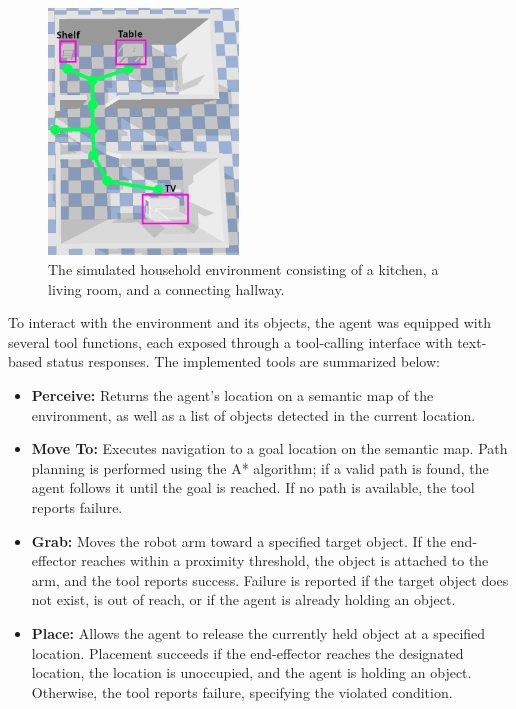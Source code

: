 \documentclass[../report.tex]{subfiles}
\begin{document}
\begin{figure}[h!]
	\centering
	\includegraphics[width=0.45\textwidth]{figures/environment.png}
	\caption{The simulated household environment consisting of a kitchen, a living room, and a connecting hallway.}
	\label{fig:environment}
\end{figure}

To interact with the environment and its objects, the agent was equipped with several tool functions, each exposed through a tool-calling interface with text-based status responses. The implemented tools are summarized below:
\begin{itemize}
	\item \textbf{Perceive:} Returns the agent's location on a semantic map of the environment, as well as a list of objects detected in the current location.
	\item \textbf{Move To:} Executes navigation to a goal location on the semantic map. Path planning is performed using the A* algorithm; if a valid path is found, the agent follows it until the goal is reached. If no path is available, the tool reports failure.
	\item \textbf{Grab:} Moves the robot arm toward a specified target object. If the end-effector reaches within a proximity threshold, the object is attached to the arm, and the tool reports success. Failure is reported if the target object does not exist, is out of reach, or if the agent is already holding an object.
	\item \textbf{Place:} Allows the agent to release the currently held object at a specified location. Placement succeeds if the end-effector reaches the designated location, the location is unoccupied, and the agent is holding an object. Otherwise, the tool reports failure, specifying the violated condition.
\end{itemize}
\end{document}
